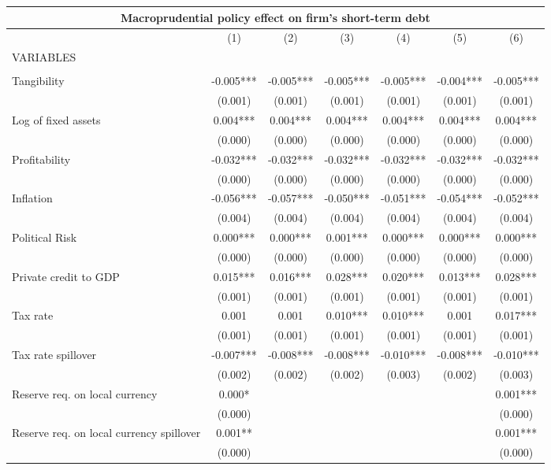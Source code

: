 \begin{tabular}{lcccccc}
\multicolumn{7}{c}{Macroprudential policy effect on firm's short-term debt} \\ \hline
 & (1) & (2) & (3) & (4) & (5) & (6) \\
VARIABLES &  &  &  &  &  &  \\ \hline
 &  &  &  &  &  &  \\
Tangibility & -0.005*** & -0.005*** & -0.005*** & -0.005*** & -0.004*** & -0.005*** \\
 & (0.001) & (0.001) & (0.001) & (0.001) & (0.001) & (0.001) \\
Log of fixed assets & 0.004*** & 0.004*** & 0.004*** & 0.004*** & 0.004*** & 0.004*** \\
 & (0.000) & (0.000) & (0.000) & (0.000) & (0.000) & (0.000) \\
Profitability & -0.032*** & -0.032*** & -0.032*** & -0.032*** & -0.032*** & -0.032*** \\
 & (0.000) & (0.000) & (0.000) & (0.000) & (0.000) & (0.000) \\
Inflation & -0.056*** & -0.057*** & -0.050*** & -0.051*** & -0.054*** & -0.052*** \\
 & (0.004) & (0.004) & (0.004) & (0.004) & (0.004) & (0.004) \\
Political Risk & 0.000*** & 0.000*** & 0.001*** & 0.000*** & 0.000*** & 0.000*** \\
 & (0.000) & (0.000) & (0.000) & (0.000) & (0.000) & (0.000) \\
Private credit to GDP & 0.015*** & 0.016*** & 0.028*** & 0.020*** & 0.013*** & 0.028*** \\
 & (0.001) & (0.001) & (0.001) & (0.001) & (0.001) & (0.001) \\
Tax rate & 0.001 & 0.001 & 0.010*** & 0.010*** & 0.001 & 0.017*** \\
 & (0.001) & (0.001) & (0.001) & (0.001) & (0.001) & (0.001) \\
Tax rate spillover & -0.007*** & -0.008*** & -0.008*** & -0.010*** & -0.008*** & -0.010*** \\
 & (0.002) & (0.002) & (0.002) & (0.003) & (0.002) & (0.003) \\
Reserve req. on local currency & 0.000* &  &  &  &  & 0.001*** \\
 & (0.000) &  &  &  &  & (0.000) \\
Reserve req. on local currency spillover & 0.001** &  &  &  &  & 0.001*** \\
 & (0.000) &  &  &  &  & (0.000) \\

\end{tabular}
